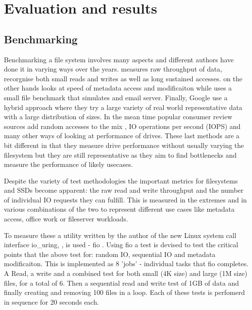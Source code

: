 \chapter{Evaluation and results}

    \section{Benchmarking}


        Benchmarking a file system involves many aspects and different authors
        have done it in varying ways over the years.  \citeauthor{FFS} measures
        raw throughput of data, \citeauthor{LFS} recorgnise both small reads
        and writes as well as long sustained accesses.
        \citeauthor{soft_updates} on the other hands looks at speed of metadata
        access and modificaiton while \citeauthor{ext4_space_maps} uses a small
        file benchmark that simulates and email server. Finally, Google use a
        hybrid approach where they try a large variety of real world
        representative data with a large distribution of sizes. In the mean
        time popular consumer review sources add random accesses to the mix
        \cite{servethehome_review}, IO operations per second (IOPS)
        \cite{tomshardware_review} and many other ways of looking at
        performance of drives. These last methods are a bit different in that
        they measure drive performance without usually varying the filesystem
        but they are still representative as they aim to find bottlenecks and
        measure the performance of likely usecases.

        Despite the variety of test methodologies the important metrics for
        filesystems and SSDs become apparent: the raw read and write throughput
        and the number of individual IO requests they can fulfill. This is
        measured in the extremes and in various combinations of the two to
        represent different use cases like metadata access, office work or
        fileserver workloads.

        To measure these a utility written by the author of the new Linux
        system call interface io\_uring, \citeauthor{IO_uring}, is used - fio
        \cite{fio}. Using fio a test is devised to test the critical points
        that the above test for: random IO, sequential IO and metadata
        modificaiton. This is implemented as 8 'jobs' - individual tasks that
        fio completes. A Read, a write and a combined test for both small (4K
        size) and large (1M size) files, for a total of 6.  Then a sequential
        read and write test of 1GB of data and finally creating and removing
        100 files in a loop. Each of these tests is perfomerd in sequence for
        20 seconds each.


